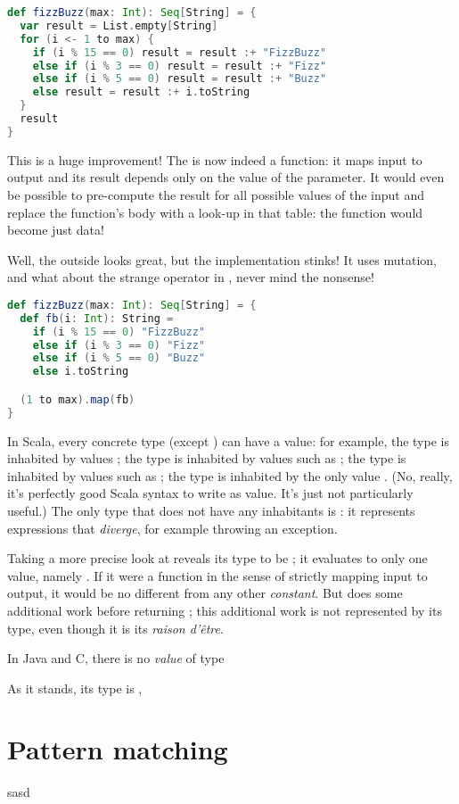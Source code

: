 \documentclass[10 pt]{article}
\begin{document}
\begin{lstlisting}[caption={Fizz Buzz}, label={code:fb2}, language=Scala, escapechar=|]
def fizzBuzz(max: Int): Seq[String] = {
  var result = List.empty[String]
  for (i <- 1 to max) {
    if (i % 15 == 0) result = result :+ "FizzBuzz"
    else if (i % 3 == 0) result = result :+ "Fizz"
    else if (i % 5 == 0) result = result :+ "Buzz"
    else result = result :+ i.toString
  }
  result
}
\end{lstlisting}

This is a huge improvement! The  is now indeed a function: it maps input to output and its result depends only on the value of the parameter. It would even be possible to pre-compute the result for all possible values of the input and replace the function's body with a look-up in that table: the function would become just data! 

Well, the outside looks great, but the implementation stinks! It uses mutation, and what about the strange \pcode{:+} operator in , never mind the  nonsense!

\begin{lstlisting}[caption={Fizz Buzz}, label={code:fb3}, language=Scala, escapechar=|]
def fizzBuzz(max: Int): Seq[String] = {
  def fb(i: Int): String =
    if (i % 15 == 0) "FizzBuzz"
    else if (i % 3 == 0) "Fizz"
    else if (i % 5 == 0) "Buzz"
    else i.toString

  (1 to max).map(fb)
}
\end{lstlisting}




In Scala, every concrete type (except ) can have a value: for example, the type  is inhabited by values ; the type  is inhabited by values such as ; the type  is inhabited by values such as ; the type  is inhabited by the only value \pcode{()}. (No, really, it's perfectly good Scala syntax to write \pcode{()} as value. It's just not particularly useful.) The only type that does not have any inhabitants is : it represents expressions that \emph{diverge}, for example throwing an exception.

Taking a more precise look at  reveals its type to be ; it evaluates to only one value, namely \pcode{()}. If it were a function in the sense of strictly mapping input to output, it would be no different from any other \pcode{()} \emph{constant}. But  does some additional work before returning \pcode{()}; this additional work is not represented by its type, even though it is its \emph{raison d'être}. 

In Java and C, there is no \emph{value} of type 

 As it stands, its type is , 

\newpage

\section{Pattern matching}
sasd
\newpage

\section{}

\printbibliography
\end{document}
